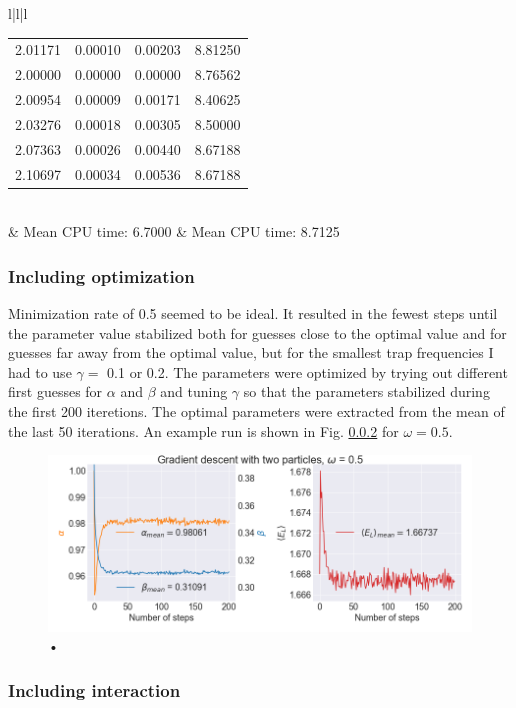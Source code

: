 \begin{table}[H]
\begin{tabular}{l|l|l}
\begin{tabular}{cccc}
2.01171 & 0.00010 & 0.00203 & 8.81250\\
2.00000 & 0.00000 & 0.00000 & 8.76562\\
2.00954 & 0.00009 & 0.00171 & 8.40625\\
2.03276 & 0.00018 & 0.00305 & 8.50000\\
2.07363 & 0.00026 & 0.00440 & 8.67188\\
2.10697 & 0.00034 & 0.00536 & 8.67188\\ \hline
\end{tabular}\\
& Mean CPU time:  6.7000 & Mean CPU time:  8.7125\\
\end{tabular}
\end{table}

\subsubsection{Including optimization}

Minimization rate of 0.5 seemed to be ideal. It resulted in the fewest steps until the parameter value stabilized both for guesses close to the optimal value and for guesses far away from the optimal value, but for the smallest trap frequencies I had to use $\gamma = $ 0.1 or 0.2. The parameters were optimized by trying out different first guesses for $\alpha$ and $\beta$ and tuning $\gamma$ so that the parameters stabilized during the first 200 iteretions. The optimal parameters were extracted from the mean of the last 50 iterations. An example run is shown in Fig. \ref{} for $\omega = 0.5$.

\begin{figure}
\center
\includegraphics[width=0.8\linewidth]{../Results/example_gradient_descent}\caption{•}\label{fig:example_gradient_descent}
\end{figure}

\subsubsection{Including interaction}


